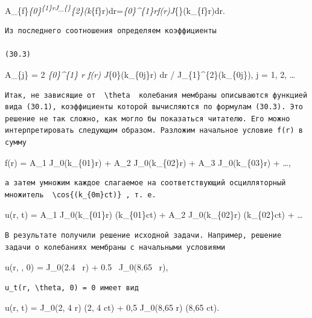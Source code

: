 \documentclass[
  ukrainian,
]{article}
\begin{document}
A\_\{f\}\int\emph{\{0\}\textsuperscript{\{1\}rJ\_\{\theta\}}\{2\}(k}\{\theta f\}r)dr=\int\emph{\{0\}\^{}\{1\}rf(r)J}\{\theta\}(k\_\{\theta f\}r)dr.

\begin{verbatim}
Из последнего соотношения определяем коэффициенты

(30.3)
\end{verbatim}

A\_\{j\} = 2 \int\emph{\{0\}\^{}\{1\} r f(r) J}\{0\}(k\_\{0j\}r) dr /
J\_\{1\}\^{}\{2\}(k\_\{0j\}), \quad j = 1, 2, \dots

\begin{verbatim}
Итак, не зависящие от  \theta  колебания мембраны описываются функцией вида (30.1), коэффициенты которой вычисляются по формулам (30.3). Это решение не так сложно, как могло бы показаться читателю. Его можно интерпретировать следующим образом. Разложим начальное условие f(r) в сумму
\end{verbatim}

f(r) = A\_1 J\_0(k\_\{01\}r) + A\_2 J\_0(k\_\{02\}r) + A\_3
J\_0(k\_\{03\}r) + \dots,

\begin{verbatim}
а затем умножим каждое слагаемое на соответствующий осцилляторный множитель  \cos{(k_{0m}ct)} , т. е.
\end{verbatim}

u(r, t) = A\_1 J\_0(k\_\{01\}r) \cos(k\_\{01\}ct) + A\_2
J\_0(k\_\{02\}r) \cos(k\_\{02\}ct) + \dots

\begin{verbatim}
В результате получили решение исходной задачи. Например, решение задачи о колебаниях мембраны с начальными условиями
\end{verbatim}

u(r, \theta, 0) = J\_0(2.4 ~r) + 0.5 ~J\_0(8.65 ~r),

\begin{verbatim}
u_t(r, \theta, 0) = 0 имеет вид
\end{verbatim}

u(r, t) = J\_0(2, 4 r) \cos(2, 4 ct) + 0,5 J\_0(8,65 r) \cos(8,65 ct).
\end{document}
